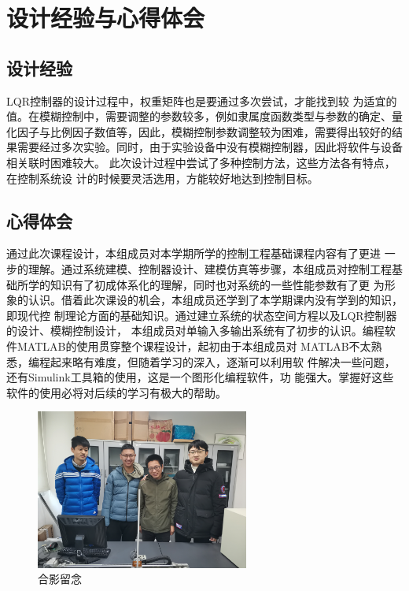 \chapter{设计经验与心得体会}
\section{设计经验}
LQR控制器的设计过程中，权重矩阵也是要通过多次尝试，才能找到较
为适宜的值。在模糊控制中，需要调整的参数较多，例如隶属度函数类型与参数的确定、量化因子与比例因子数值等，因此，模糊控制参数调整较为困难，需要得出较好的结果需要经过多次实验。同时，由于实验设备中没有模糊控制器，因此将软件与设备相关联时困难较大。
此次设计过程中尝试了多种控制方法，这些方法各有特点，在控制系统设
计的时候要灵活选用，方能较好地达到控制目标。
\section{心得体会}
通过此次课程设计，本组成员对本学期所学的控制工程基础课程内容有了更进
一步的理解。通过系统建模、控制器设计、建模仿真等步骤，本组成员对控制工程基
础所学的知识有了初成体系化的理解，同时也对系统的一些性能参数有了更
为形象的认识。借着此次课设的机会，本组成员还学到了本学期课内没有学到的知识，即现代控
制理论方面的基础知识。通过建立系统的状态空间方程以及LQR控制器的设计、模糊控制设计，
本组成员对单输入多输出系统有了初步的认识。编程软件MATLAB的使用贯穿整个课程设计，起初由于本组成员对
MATLAB不太熟悉，编程起来略有难度，但随着学习的深入，逐渐可以利用软
件解决一些问题，还有Simulink工具箱的使用，这是一个图形化编程软件，功
能强大。掌握好这些软件的使用必将对后续的学习有极大的帮助。

\begin{figure}[hbpt]
\centering
\includegraphics[width=7cm]{heying.jpg}
\caption{合影留念}\label{}
\end{figure}






